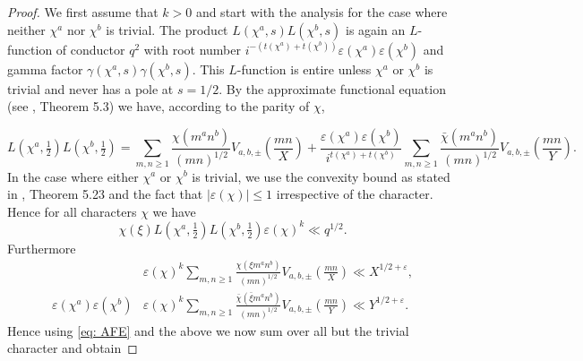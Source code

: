\documentclass[12pt]{amsart}
\theoremstyle{plain}
\theoremstyle{definition}
\theoremstyle{remark}
\numberwithin{equation}{section}
\renewcommand{\geq}{\geqslant}
\renewcommand{\leq}{\leqslant}
\begin{document}
\begin{proof} 
We first assume that $k>0$ and start with the analysis for the case where neither $\chi^a$ nor $\chi^b $ is trivial. 
The product $L(\chi^a,s)L(\chi^b,s)$ is again an $L$-function of conductor $q^2$ with root number $i^{-(t(\chi^a)+t(\chi^b))}\varepsilon(\chi^a)\varepsilon(\chi^b)$ and gamma factor $\gamma(\chi^a,s)\gamma(\chi^b,s)$. This $L$-function is entire unless $\chi^a$ or $\chi^b$ is trivial and never has a pole at $s=1/2$.
By the approximate functional equation (see \cite{IwaKowAnalyticNT}, Theorem 5.3) we have, according to the parity of $\chi$,

\begin{equation}\label{eq: AFE}
L(\chi^a,\tfrac 12)L(\chi^b,\tfrac 12)=\sum_{m,n\geq 1}\frac{\chi(m^an^b)}{(mn)^{1/2}}V_{a,b,\pm}\left(\frac{mn}{X}\right)+\frac{\varepsilon(\chi^a)\varepsilon(\chi^b)}{i^{t(\chi^a)+t(\chi^b)}}\sum_{m,n\geq 1}\frac{\bar \chi(m^an^b)}{(mn)^{1/2}}V_{a,b,\pm}\left(\frac{mn}{Y}\right).\end{equation}
 In the case where either $\chi^a$ or $\chi^b $ is trivial, we use the convexity bound as stated in \cite{IwaKowAnalyticNT}, Theorem 5.23 and the fact that $|\varepsilon(\chi)|\leq 1$ irrespective of the character. Hence for all characters $\chi$ we have
  \begin{equation}\label{eq: chia or chi b trivial}
        \chi(\xi)L(\chi^a,\tfrac 12)L(\chi^b,\tfrac 12)\varepsilon(\chi)^k\ll q^{1/2}.
    \end{equation} 
Furthermore 
\begin{align*}
    &\varepsilon(\chi)^k\sum_{m,n\geq 1}\frac{\chi(\xi m^an^b)}{(mn)^{1/2}}V_{a,b,\pm}\left(\frac{mn}{X}\right)\ll X^{1/2+\varepsilon},\\
    \varepsilon(\chi^a)\varepsilon(\chi^b) &\varepsilon(\chi)^k\sum_{m,n\geq 1}\frac{\bar \chi(\bar \xi m^an^b)}{(mn)^{1/2}}V_{a,b,\pm}\left(\frac{mn}{Y}\right)\ll Y^{1/2+\varepsilon}.
\end{align*}
Hence using \eqref{eq: AFE} and the above we now sum over all but the trivial character and obtain 



\end{proof}
\end{document}
